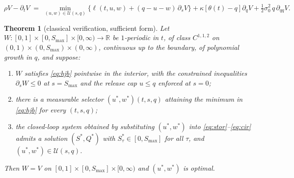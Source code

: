 \documentclass[10pt,a4paper]{amsart}
\newtheorem{theorem}{Theorem}
\newcommand{\R}{\mathbb{R}}
\begin{document}
\begin{equation}
\rho V - \partial_t V \;=\;
\min_{(u,w)\in\mathcal U(s,q)}
\Big\{ \ell(t,u,w) + (q-u-w)\,\partial_s V \Big\}
+ \kappa\left[\theta(t)-q\right]\partial_q V
+ \tfrac12\sigma_0^2\, q\, \partial_{qq} V .
\label{eq:hjb}
\end{equation}

\begin{theorem}[classical verification, sufficient form]
\label{thm:verification}
Let $W:[0,1]\times[0,S_{\max}]\times[0,\infty)\to\R$ be $1$-periodic in
$t$, of class $C^{1,1,2}$ on
$(0,1)\times(0,S_{\max})\times(0,\infty)$, continuous up to the boundary,
of polynomial growth in $q$, and suppose:
\begin{enumerate}
\item[(i)] $W$ satisfies \eqref{eq:hjb} pointwise in the interior, with the
constrained inequalities
$\partial_s W\le0$ at $s=S_{\max}$ and the release cap $u\le q$ enforced at
$s=0$;
\item[(ii)] there is a measurable selector
$(u^*,w^*)(t,s,q)$ attaining the minimum in \eqref{eq:hjb} for every
$(t,s,q)$;
\item[(iii)] the closed-loop system obtained by substituting
$(u^*,w^*)$ into \eqref{eq:stor}--\eqref{eq:cir} admits a solution
$(S^*,Q^*)$ with $S^*_\tau\in[0,S_{\max}]$ for all $\tau$, and
$(u^*,w^*)\in\mathcal U(s,q)$.
\end{enumerate}
Then $W=V$ on $[0,1]\times[0,S_{\max}]\times[0,\infty)$ and $(u^*,w^*)$ is
optimal.
\end{theorem}
\end{document}

